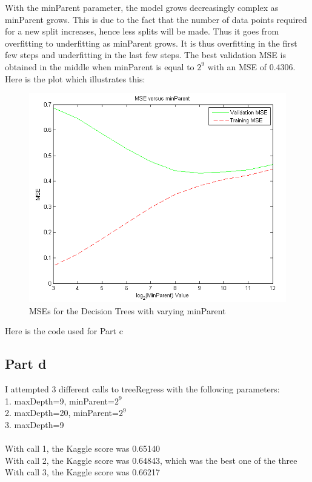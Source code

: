 \documentclass[twoside,11pt]{article}
\theoremstyle{definition}
\begin{document}
With the minParent parameter, the model grows decreasingly complex as minParent grows. This is due to the fact that the number of data points required for a new split increases, hence less splits will be made. Thus it goes from overfitting to underfitting as minParent grows. It is thus overfitting in the first few steps and underfitting in the last few steps. The best validation MSE is obtained in the middle when minParent is equal to $2^9$ with an MSE of 0.4306. Here is the plot which illustrates this:

\begin{figure}[h]
\centering
\includegraphics[width=6 in]{prob3plot2.png}
\caption{MSEs for the Decision Trees with varying minParent}
\end{figure}

\newpage

Here is the code used for Part c\\


\newpage

\subsection*{Part d}

I attempted 3 different calls to treeRegress with the following parameters:\\
1. maxDepth=9, minParent=$2^9$\\
2. maxDepth=20, minParent=$2^9$\\
3. maxDepth=9\\
\\
With call 1, the Kaggle score was 0.65140\\
With call 2, the Kaggle score was 0.64843, which was the best one of the three\\
With call 3, the Kaggle score was 0.66217\\
\end{document}
